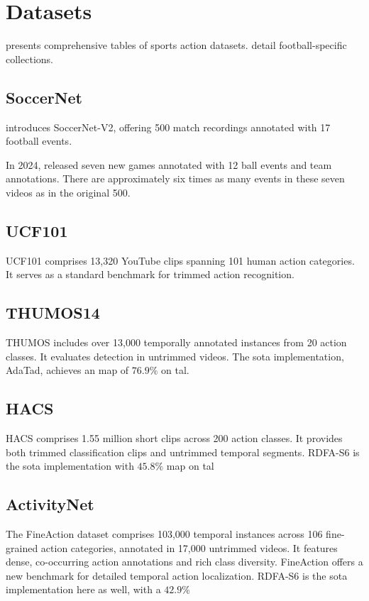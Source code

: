 \section{Datasets}
\label{sec:datasets}

\textcite{survey_of_survey} presents comprehensive tables of sports action datasets. \textcite{seweryn_survey_2023} detail football-specific collections.

\subsection{SoccerNet}

\textcite{deliege_soccernet-v2_dataset_2021} introduces SoccerNet-V2, offering 500 match recordings annotated with 17 football events.

In 2024, \textcite{deliege_soccernet-v2_dataset_2021} released seven new games annotated with 12 ball events and team annotations. There are approximately six times as many events in these seven videos as in the original 500. 

\subsection{UCF101}
UCF101 \cite{dataset:UCF101} comprises 13,320 YouTube clips spanning 101 human action categories. It serves as a standard benchmark for trimmed action recognition. 

\subsection{THUMOS14}
THUMOS \cite{dataset:thumos} includes over 13,000 temporally annotated instances from 20 action classes. It evaluates detection in untrimmed videos. The \acrfull{sota} implementation, AdaTad, achieves an \acrfull{map} of $76.9\%$ on \acrfull{tal}.

\subsection{HACS}
HACS \cite{dataset:hacs} comprises 1.55 million short clips across 200 action classes. It provides both trimmed classification clips and untrimmed temporal segments. RDFA-S6 is the \acrshort{sota} implementation with $45.8\%$ \acrshort{map} on \acrshort{tal}

\subsection{ActivityNet}
The FineAction dataset \cite{dataset:fineaction} comprises 103,000 temporal instances across 106 fine-grained action categories, annotated in 17,000 untrimmed videos. It features dense, co-occurring action annotations and rich class diversity. FineAction offers a new benchmark for detailed temporal action localization. RDFA-S6 is the \acrshort{sota} implementation here as well, with a $42.9\%$

